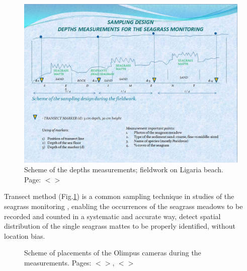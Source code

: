 \documentclass[11pt]{article}
\begin{document}
\begin{figure}[H]
	\begin{center}
		\includegraphics[scale=0.30]{Sampling_design.jpg}
		\caption{Scheme of the depths measurements; fieldwork on Ligaria beach. Page: $<$\pageref{page-26}$>$}\label{fig:A.4}
	\end{center}	
\end{figure}

Transect method (Fig.\ref{fig:A.4}) is a common sampling technique in studies of the seagrass monitoring \cite{Shortis07}\label{Shortis07},
enabling the occurrences of the seagrass meadows to be recorded and counted in a systematic and
accurate way, detect spatial distribution of the single seagrass mattes to be properly identified,
without location bias. 

\begin{figure}[H]
	\centering
	\caption{Scheme of placements of the Olimpus cameras during the measurements. Pages: $<$\pageref{page-26}$>$, $<$\pageref{page-27}$>$}
	\label{fig:3.5}
\end{figure}
\end{document}
